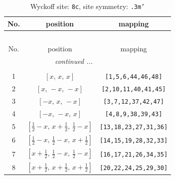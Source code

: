 \documentclass[fleqn,8pt]{jsarticle}
\begin{document}
\renewcommand{\arraystretch}{1.2}
\begin{longtable}{ccc}
\caption{Wyckoff site: {\tt 8c}, site symmetry: {\tt .3m'}}
 \\
 \hline \hline
No. & position & mapping \\ \hline \endfirsthead

\multicolumn{2}{l}{\tablename\ \thetable{}} \\
 \hline \hline
No. & position & mapping \\ \hline \endhead

 \hline \hline
\multicolumn{2}{r}{\footnotesize\it continued ...} \\ \endfoot

 \hline \hline
\multicolumn{2}{r}{} \\ \endlastfoot

1 & $\left[ x,\, x,\, x \right]$ & {\tt [1,5,6,44,46,48]} \\ \hline
2 & $\left[ x,\, - x,\, - x \right]$ & {\tt [2,10,11,40,41,45]} \\ \hline
3 & $\left[ - x,\, x,\, - x \right]$ & {\tt [3,7,12,37,42,47]} \\ \hline
4 & $\left[ - x,\, - x,\, x \right]$ & {\tt [4,8,9,38,39,43]} \\ \hline
5 & $\left[ \frac{1}{2} - x,\, x + \frac{1}{2},\, \frac{1}{2} - x \right]$ & {\tt [13,18,23,27,31,36]} \\ \hline
6 & $\left[ \frac{1}{2} - x,\, \frac{1}{2} - x,\, x + \frac{1}{2} \right]$ & {\tt [14,15,19,28,32,33]} \\ \hline
7 & $\left[ x + \frac{1}{2},\, \frac{1}{2} - x,\, \frac{1}{2} - x \right]$ & {\tt [16,17,21,26,34,35]} \\ \hline
8 & $\left[ x + \frac{1}{2},\, x + \frac{1}{2},\, x + \frac{1}{2} \right]$ & {\tt [20,22,24,25,29,30]} \\
\end{longtable}
\renewcommand{\arraystretch}{1.2}
\end{document}
